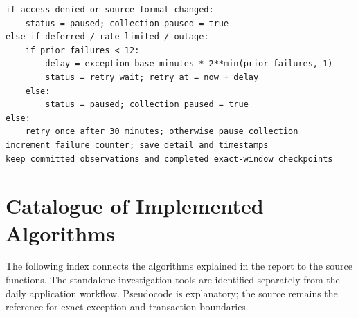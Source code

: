 \documentclass[12pt,a4paper,oneside]{report}
\numberwithin{equation}{chapter}
\numberwithin{figure}{chapter}
\numberwithin{table}{chapter}
\theoremstyle{definition}
\begin{document}
\begin{lstlisting}[caption={Failure transition after a running job, simplified}]
if access denied or source format changed:
    status = paused; collection_paused = true
else if deferred / rate limited / outage:
    if prior_failures < 12:
        delay = exception_base_minutes * 2**min(prior_failures, 1)
        status = retry_wait; retry_at = now + delay
    else:
        status = paused; collection_paused = true
else:
    retry once after 30 minutes; otherwise pause collection
increment failure counter; save detail and timestamps
keep committed observations and completed exact-window checkpoints
\end{lstlisting}

\chapter{Catalogue of Implemented Algorithms}
The following index connects the algorithms explained in the report to the source functions. The standalone investigation tools are identified separately from the daily application workflow. Pseudocode is explanatory; the source remains the reference for exact exception and transaction boundaries.
\end{document}
